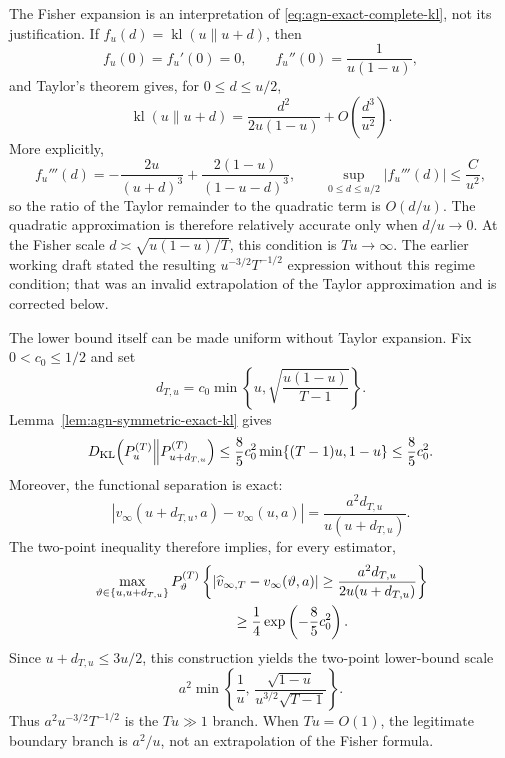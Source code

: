 The Fisher expansion is an interpretation of
\eqref{eq:agn-exact-complete-kl}, not its justification.  If
\(f_u(d)=\operatorname{kl}(u\|u+d)\), then
\[
 f_u(0)=f_u'(0)=0,\qquad
 f_u''(0)=\frac1{u(1-u)},
\]
and Taylor's theorem gives, for \(0\leq d\leq u/2\),
\begin{equation}
 \operatorname{kl}(u\|u+d)
 =\frac{d^2}{2u(1-u)}
 +O\left(\frac{d^3}{u^2}\right).
 \label{eq:agn-kl-taylor-domain}
\end{equation}
More explicitly,
\[
 f_u'''(d)
 =-\frac{2u}{(u+d)^3}
 +\frac{2(1-u)}{(1-u-d)^3},
 \qquad
 \sup_{0\leq d\leq u/2}|f_u'''(d)|\leq \frac{C}{u^2},
\]
so the ratio of the Taylor remainder to the quadratic term is
\(O(d/u)\).  The quadratic approximation is therefore relatively accurate
only when \(d/u\to0\).  At the Fisher scale
\(d\asymp\sqrt{u(1-u)/T}\), this condition is \(Tu\to\infty\).
The earlier working draft stated the resulting
\(u^{-3/2}T^{-1/2}\) expression without this regime condition; that was an
invalid extrapolation of the Taylor approximation and is corrected below.

The lower bound itself can be made uniform without Taylor expansion.  Fix
\(0<c_0\leq1/2\) and set
\begin{equation}
 d_{T,u}
 =c_0\min\left\{
 u,\sqrt{\frac{u(1-u)}{T-1}}
 \right\}.
 \label{eq:agn-boundary-perturbation}
\end{equation}
Lemma~\ref{lem:agn-symmetric-exact-kl} gives
\[
 D_{\rm KL}\!\left(P_u^{(T)}\middle\|
 P_{u+d_{T,u}}^{(T)}\right)
 \leq\frac85c_0^2
 \min\{(T-1)u,1-u\}
 \leq\frac85c_0^2.
\]
Moreover, the functional separation is exact:
\[
 |v_\infty(u+d_{T,u},a)-v_\infty(u,a)|
 =\frac{a^2d_{T,u}}{u(u+d_{T,u})}.
\]
The two-point inequality therefore implies, for every estimator,
\begin{align}
 &\max_{\vartheta\in\{u,u+d_{T,u}\}}
 P_\vartheta^{(T)}
 \left\{
 |\widehat v_{\infty,T}-v_\infty(\vartheta,a)|
 \geq
 \frac{a^2d_{T,u}}{2u(u+d_{T,u})}
 \right\}
 \nonumber\\
 &\hspace{35mm}\geq
 \frac14\exp\left(-\frac85c_0^2\right).
 \label{eq:agn-boundary-two-regime-lb}
\end{align}
Since \(u+d_{T,u}\leq3u/2\), this construction yields the two-point
lower-bound scale
\begin{equation}
 a^2\min\left\{
 \frac1u,\,
 \frac{\sqrt{1-u}}{u^{3/2}\sqrt{T-1}}
 \right\}.
 \label{eq:agn-persistence-gap}
\end{equation}
Thus \(a^2u^{-3/2}T^{-1/2}\) is the \(Tu\gg1\) branch.  When
\(Tu=O(1)\), the legitimate boundary branch is \(a^2/u\), not an
extrapolation of the Fisher formula.

